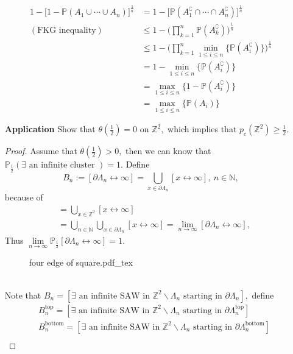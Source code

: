 \documentclass[12pt,a4paper]{report}
\theoremstyle{definition}
\newcommand{\incfig}[1]{%
{#1.pdf_tex}
}
\begin{document}
\begin{enumerate}
\begin{align*}
        1-\Big[1-\mathbb{P}(A_1\cup\cdots \cup A_n)\Big]^\frac{1}{n}&=1-\Big[\mathbb{P}(A_1^\complement\cap\cdots \cap A_n^\complement)\Big]^\frac{1}{n}\\
        (\mbox{FKG inequality})&\leq 1-\Big({\displaystyle \prod_{k=1}^{n}}\mathbb{P}(A_k^\complement)\Big)^\frac{1}{n}\\
        &\leq 1-\Big({\displaystyle \prod_{k=1}^{n}}\min_{1\leq i\leq n}\{\mathbb{P}(A_i^\complement)\}\Big)^\frac{1}{n}\\
        &=1-\min_{1\leq i\leq n}\{\mathbb{P}(A_i^\complement)\}\\
        &=\max_{1\leq i\leq n}\{1-\mathbb{P}(A_i^\complement)\}\\
        &=\max_{1\leq i\leq n}\{\mathbb{P}(A_i)\}
    \end{align*}
    \item[\textbf{Application}] Show that $\theta(\frac{1}{2})=0$ on $\mathbb{Z}^2,$ which implies that $p_c(\mathbb{Z}^2)\geq\frac{1}{2}.$
    \begin{proof}
    Assume that $\theta(\frac{1}{2})>0,$ then we can know that $\mathbb{P}_{\frac{1}{2}}(\exists\mbox{ an infinite cluster })=1.$ Define
    \[
    B_n:=[\partial\Lambda_n\leftrightarrow\infty]=\bigcup_{x\in \partial\Lambda_n}[x\leftrightarrow\infty],\ n\in\mathbb{N},
    \]
    because of 
    \begin{align*}
    [\exists\mbox{ an infinite cluster}]&=\bigcup_{x\in \mathbb{Z}^2}[x\leftrightarrow\infty]\\
    &=\bigcup_{n\in\mathbb{N}}\bigcup_{x\in\partial\Lambda_n}[x\leftrightarrow\infty] =\lim_{n\to\infty}[\partial\Lambda_n\leftrightarrow\infty],
    \end{align*}
    Thus $\lim\limits_{n\to\infty}\mathbb{P}_{\frac{1}{2}}[\partial\Lambda_n\leftrightarrow\infty]=1.$
	\begin{figure}[htp]
	\centering
	\def\svgwidth{5cm}
	\incfig{four edge of square}
	\end{figure}\\
    Note that $B_n=[\exists\mbox{ an infinite SAW in }\mathbb{Z}^2\backslash\Lambda_n\mbox{ starting in }\partial\Lambda_n],$ define
    \begin{align*}
        &B_n^{\mathrm{top}}=[\exists\mbox{ an infinite SAW in }\mathbb{Z}^2\backslash\Lambda_n\mbox{ starting in }\partial\Lambda_n^\mathrm{top}]\\
        &B_n^{\mathrm{bottom}}=[\exists\mbox{ an infinite SAW in }\mathbb{Z}^2\backslash\Lambda_n\mbox{ starting in }\partial\Lambda_n^\mathrm{bottom}]\\

\end{align*}
\end{proof}
\end{enumerate}
\end{document}
